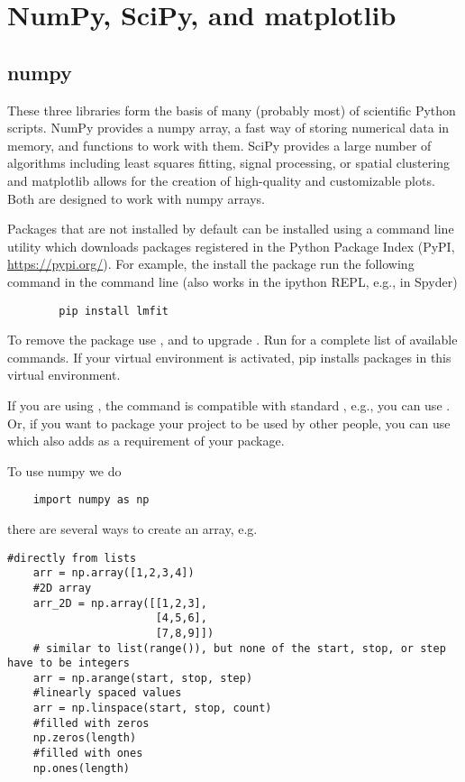 \newpage
\section{NumPy, SciPy, and matplotlib}
\subsection{numpy}
These three libraries form the basis of many (probably most) of scientific Python scripts. NumPy provides a numpy array, a fast way of storing numerical data in memory, and functions to work with them. SciPy provides a large number of algorithms including least squares fitting, signal processing, or spatial clustering and matplotlib allows for the creation of high-quality and customizable plots. Both are designed to work with numpy arrays.

\begin{syntax}
    Packages that are not installed by default can be installed using a command line utility  which downloads packages registered in the Python Package Index (PyPI, \url{https://pypi.org/}). For example, the install the package  run the following command in the command line (also works in the ipython REPL, e.g., in Spyder)
    \begin{lstlisting}
        pip install lmfit
    \end{lstlisting}
    To remove the package use , and to upgrade . Run  for a complete list of available commands. If your virtual environment is activated, pip installs packages in this virtual environment.

    If you are using , the command  is compatible with standard , e.g., you can use . Or, if you want to package your project to be used by other people, you can use  which also adds  as a requirement of your package.
\end{syntax}

To use numpy we do
\begin{lstlisting}
    import numpy as np
\end{lstlisting}
there are several ways to create an array, e.g.
\begin{lstlisting}[caption=Array creation.]
    #directly from lists
    arr = np.array([1,2,3,4])
    #2D array
    arr_2D = np.array([[1,2,3],
                       [4,5,6],
                       [7,8,9]])
    # similar to list(range()), but none of the start, stop, or step have to be integers
    arr = np.arange(start, stop, step)
    #linearly spaced values
    arr = np.linspace(start, stop, count)
    #filled with zeros
    np.zeros(length)
    #filled with ones
    np.ones(length)
\end{lstlisting}

